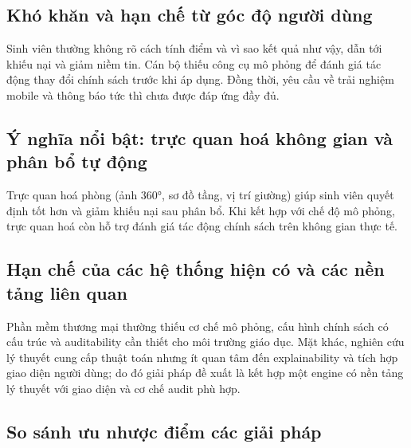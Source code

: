 \documentclass[a4paper,12pt,openany,oneside]{report}
\begin{document}
\subsection{Khó khăn và hạn chế từ góc độ người dùng}

Sinh viên thường không rõ cách tính điểm và vì sao kết quả như vậy, dẫn tới khiếu
nại và giảm niềm tin. Cán bộ thiếu công cụ mô phỏng để đánh giá tác động thay
đổi chính sách trước khi áp dụng. Đồng thời, yêu cầu về trải nghiệm mobile và
thông báo tức thì chưa được đáp ứng đầy đủ.

\subsection{Ý nghĩa nổi bật: trực quan hoá không gian và phân bổ tự động}

Trực quan hoá phòng (ảnh 360°, sơ đồ tầng, vị trí giường) giúp sinh viên quyết
định tốt hơn và giảm khiếu nại sau phân bổ. Khi kết hợp với chế độ mô phỏng,
trực quan hoá còn hỗ trợ đánh giá tác động chính sách trên không gian thực tế.

\subsection{Hạn chế của các hệ thống hiện có và các nền tảng liên quan}

Phần mềm thương mại thường thiếu cơ chế mô phỏng, cấu hình chính sách có cấu
trúc và auditability cần thiết cho môi trường giáo dục. Mặt khác, nghiên cứu lý
thuyết cung cấp thuật toán nhưng ít quan tâm đến explainability và tích hợp giao
diện người dùng; do đó giải pháp đề xuất là kết hợp một engine có nền tảng lý
thuyết với giao diện và cơ chế audit phù hợp.

\subsection{So sánh ưu nhược điểm các giải pháp}
\end{document}
